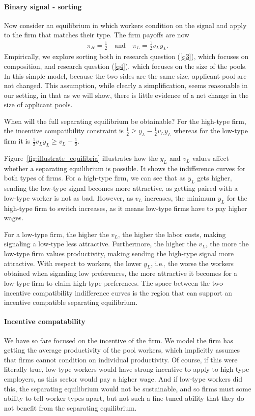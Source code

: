 \paragraph{Binary signal - sorting}
Now consider an equilibrium in which workers condition on the signal and apply to the firm that matches their type.
The firm payoffs are now
\begin{align}
  \pi_H = \frac{1}{2} \quad \mbox{and} \quad  \pi_L = \frac{1}{2} v_L y_L. \nonumber 
\end{align}
Empirically, we explore sorting both in research question (\ref{q3}), which focuses on composition, and research question (\ref{q4}), which focuses on the size of the pools. 
In this simple model, because the two sides are the same size, applicant pool are not changed.
This assumption, while clearly a simplification, seems reasonable in our setting, in that as we will show, there is little evidence of a net change in the size of applicant pools. 

When will the full separating equilibrium be obtainable?
For the high-type firm, the incentive compatibility constraint is $\frac{1}{2} \ge y_L - \frac{1}{2} v_L y_L$  whereas for the low-type firm it is $\frac{1}{2} v_L y_L \ge v_L - \frac{1}{2}$.

Figure~\ref{fig:illustrate_equilibria} illustrates how the $y_L$ and $v_L$ values affect whether a separating equilibrium is possible.
It shows the indifference curves for both types of firms.
For a high-type firm, we can see that as $y_L$ gets higher, sending the low-type signal becomes more attractive, as getting paired with a low-type worker is not as bad. 
However, as $v_L$ increases, the minimum $y_L$ for the high-type firm to switch increases, as it means low-type firms have to pay higher wages.

For a low-type firm, the higher the $v_L$, the higher the labor costs, making signaling a low-type less attractive.
Furthermore, the higher the $v_L$, the more the low-type firm values productivity, making sending the high-type signal more attractive.
With respect to workers, the lower $y_L$, i.e., the worse the workers obtained when signaling low preferences, the more attractive it becomes for a low-type firm to claim high-type preferences. 
The space between the two incentive compatibility indifference curves is the region that can support an incentive compatible separating equilibrium. 

\paragraph{Incentive compatability} 
We have so fare focused on the incentive of the firm.  
We model the firm has getting the average productivity of the pool workers, which implicitly assumes that firms cannot condition on individual productivity.  
Of course, if this were literally true, low-type workers would have strong incentive to apply to high-type employers, as this sector would pay a higher wage. And if low-type workers did this, the separating equilibrium would not be sustainable, and so firms must some ability to tell worker types apart, but not such a fine-tuned ability that they do not benefit from the separating equilibrium.

